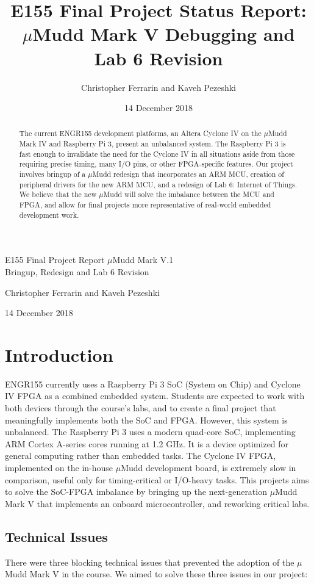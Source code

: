 \documentclass[12pt]{article}
\title{E155 Final Project Status Report: $\mu$Mudd Mark V Debugging and Lab 6 Revision}
\author{Christopher Ferrarin and Kaveh Pezeshki}
\date{14 December 2018}
\begin{document}
	\begin{LARGE}
	\noindent
		E155 
		Final 
		Project 
        Report
		$\mu$Mudd 
		Mark V.1 \\
		Bringup, Redesign
		and 
		Lab 
		6 
		Revision
	\end{LARGE}

	\vspace{0.2cm}
	
	\begin{large}
	Christopher Ferrarin and Kaveh Pezeshki
	
	14 December 2018
	\end{large}
	
	\vspace{5cm}
\begin{abstract}
    The current ENGR155 development platforms, an Altera Cyclone IV on the $\mu$Mudd Mark IV and Raspberry Pi 3, present an unbalanced system. The Raspberry Pi 3 is fast enough to invalidate the need for the Cyclone IV in all situations aside from those requiring precise timing, many I/O pins, or other FPGA-specific features. Our project involves bringup of a $\mu$Mudd redesign that incorporates an ARM MCU, creation of peripheral drivers for the new ARM MCU, and a redesign of Lab 6: Internet of Things. We believe that the new $\mu$Mudd will solve the imbalance between the MCU and FPGA, and allow for final projects more representative of real-world embedded development work.
\end{abstract}
\newpage
\section{Introduction}
    ENGR155 currently uses a Raspberry Pi 3 SoC (System on Chip) and Cyclone IV FPGA as a combined embedded system. Students are expected to work with both devices through the course's labs, and to create a final project that meaningfully implements both the SoC and FPGA. However, this system is unbalanced. The Raspberry Pi 3 uses a modern quad-core SoC, implementing ARM Cortex A-series cores running at 1.2 GHz. It is a device optimized for general computing rather than embedded tasks. The Cyclone IV FPGA, implemented on the in-house $\mu$Mudd development board, is extremely slow in comparison, useful only for timing-critical or I/O-heavy tasks. This projects aims to solve the SoC-FPGA imbalance by bringing up the next-generation $\mu$Mudd Mark V that implements an onboard microcontroller, and reworking critical labs.
    
\subsection{Technical Issues}
    There were three blocking technical issues that prevented the adoption of the $\mu$Mudd Mark V in the course. We aimed to solve these three issues in our project:
    
\end{document}

